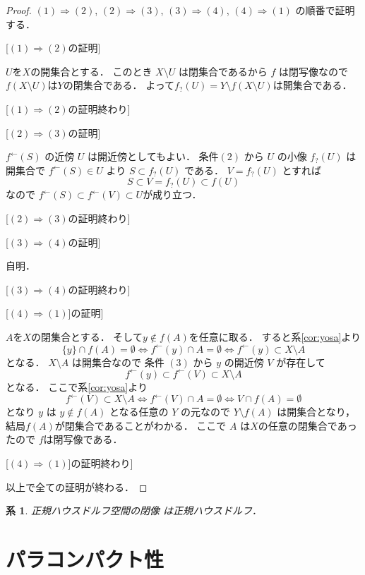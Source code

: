 \documentclass[leqno, a4paper, 12pt]{jsarticle}
\newtheorem{cor}[thm]{系}
\newcommand{\To}{\Longrightarrow}
\newcommand{\myinv}[1]{#1^{\gets}}
\newcommand{\mysm}[1]{#1_{?}}
\begin{document}
\begin{proof}
$(1)\To(2)$,
$(2)\To(3)$,
$(3)\To(4)$,
$(4)\To(1)$
の順番で証明する．

[$(1)\To(2)$の証明]

$U$を$X$の開集合とする．
このとき
$X\setminus U$
は閉集合であるから
$f$
は閉写像なので
$f(X\setminus U)$は$Y$の閉集合である．
よって$\mysm{f}(U)=Y\setminus f(X\setminus U)$は開集合である．

[$(1)\To(2)$の証明終わり]


[$(2)\To(3)$の証明]

$\myinv{f}(S)$
の近傍
$U$
は開近傍としてもよい．
条件$(2)$
から
$U$
の小像
$\mysm{f}(U)$
は開集合で
$\myinv{f}(S)\in U$
より
$S\subset  \mysm{f}(U)$
である．
$V=\mysm{f}(U)$
とすれば
\[
S\subset  V=\mysm{f}(U)\subset f(U)
\]
なので
$\myinv{f}(S)\subset \myinv{f}(V)\subset U$が成り立つ．

[$(2)\To(3)$の証明終わり]


[$(3)\To(4)$の証明]

自明．

[$(3)\To(4)$の証明終わり]

[$(4)\To(1)$]の証明]

$A$を$X$の閉集合とする．
そして$y\not\in f(A)$を任意に取る．
すると系\ref{cor:yosa}より
\[
\{y\}\cap f(A)=\emptyset\iff \myinv{f}(y)\cap A=\emptyset
\iff
 \myinv{f}(y)\subset X\setminus A
\]
となる．
$X\setminus A$
は開集合なので
条件
$(3)$
から
$y$
の開近傍
$V$
が存在して
\[
\myinv{f}(y)\subset \myinv{f}(V)\subset X\setminus A
\]
となる．
ここで系\ref{cor:yosa}より
\[
\myinv{f}(V)\subset X\setminus A\iff \myinv{f}(V)\cap A=\emptyset\iff V\cap f(A)=\emptyset
\]
となり
$y$
は
$y\not\in f(A)$
となる任意の
$Y$
の元なので
$Y\setminus f(A)$
は開集合となり，
結局$f(A)$が閉集合であることがわかる．
ここで
$A$
は$X$の任意の閉集合であったので
$f$は閉写像である．


[$(4)\To(1)$]の証明終わり]

以上で全ての証明が終わる．
\end{proof}


\begin{cor}\label{cor:closednormal}
正規ハウスドルフ空間の閉像
は正規ハウスドルフ．
\end{cor}





\section{パラコンパクト性}\label{sec:paracpt}
\end{document}
